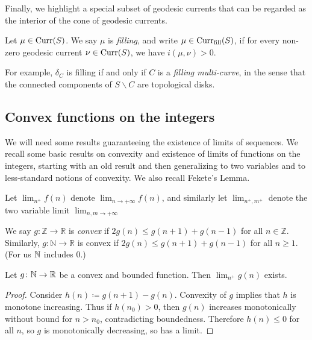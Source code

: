 Finally, we highlight a special subset of geodesic currents that can be regarded as the interior of the cone of geodesic currents.

\begin{definition}
  Let $\mu \in \operatorname{Curr}(S)$. We say $\mu$ is \emph{filling}, and write
  $\mu \in \operatorname{Curr}_{\mathrm{fill}}(S)$, if for every non-zero geodesic
  current $\nu \in \operatorname{Curr}(S)$, we have $i(\mu, \nu)>0$.
\label{def:filling_current}
\end{definition}

For example, $\delta_{C}$ is filling if and only if $C$ is a \emph{filling multi-curve}, in the sense that the connected components of $S\backslash C$ are topological disks.

 \subsection{Convex functions on the integers}
 \label{subsec:convexity}

We will need some results guaranteeing the existence of limits of sequences.
 We recall some basic results on convexity and existence of limits of
 functions on the integers, starting with an old result and then
 generalizing to two variables and to less-standard notions of
 convexity. We also recall Fekete's Lemma.
 
 Let $\lim_{n^{+}}f(n)$ denote $\lim_{n \to +\infty}f(n)$, and
 similarly let $\lim_{n^+,m^+}$ denote the two variable limit
 $\lim_{n,m \to +\infty}$


 We say $g \colon \mathbb{\mathbb{Z}} \to \mathbb{R}$ is \emph{convex}
 if $2g(n) \leq g(n+1) + g(n-1)$ for all $n \in \mathbb{Z}$.
 Similarly, $g \colon \mathbb{N} \to \mathbb{R}$ is convex if
 $2g(n) \leq g(n+1) + g(n-1)$ for all $n \geq 1$. (For us $\mathbb{N}$
 includes $0$.)

 \begin{lemma}
 Let $g \colon \mathbb{N} \to \mathbb{R}$ be a convex and bounded function.
 Then $\lim_{n^+} g(n)$ exists.
 \label{lem:onevarconvexbounded}
 \end{lemma}
 \begin{proof}
   Consider $h(n) \coloneqq g(n+1) - g(n)$. Convexity of $g$ implies
   that $h$ is monotone increasing. Thus if $h(n_0) > 0$,
   then $g(n)$ increases monotonically without bound for $n > n_0$,
   contradicting boundedness. Therefore $h(n) \le 0$ for all $n$, so $g$ is
   monotonically decreasing, so has a limit.
\end{proof}

